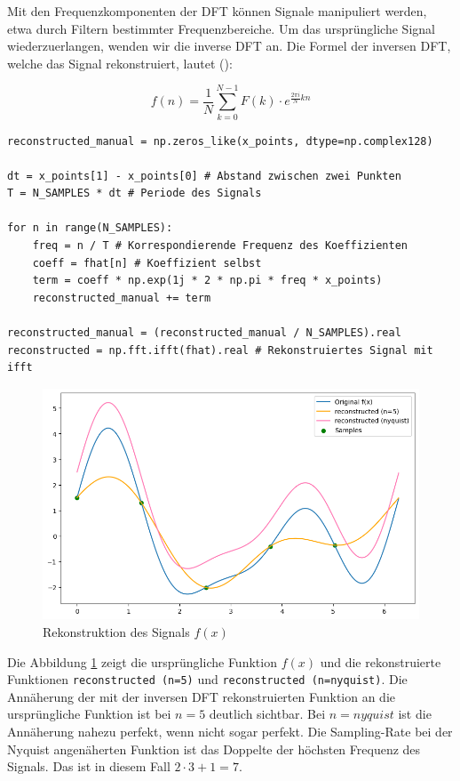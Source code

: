 \documentclass[11pt,a4paper]{article}
\begin{document}
\noindent
Mit den Frequenzkomponenten der DFT können Signale manipuliert werden, etwa durch Filtern 
bestimmter Frequenzbereiche. Um das ursprüngliche Signal wiederzuerlangen, wenden wir die inverse 
DFT an. Die Formel der inversen DFT, welche das Signal rekonstruiert, lautet 
(\cite[Chapter~3]{hansen2014fourier}):


\[
f(n) = \frac{1}{N} \sum_{k=0}^{N-1} F(k) \cdot e^{\frac{2\pi i}{N} kn}
\]

\begin{lstlisting}
reconstructed_manual = np.zeros_like(x_points, dtype=np.complex128)

dt = x_points[1] - x_points[0] # Abstand zwischen zwei Punkten
T = N_SAMPLES * dt # Periode des Signals

for n in range(N_SAMPLES):
    freq = n / T # Korrespondierende Frequenz des Koeffizienten
    coeff = fhat[n] # Koeffizient selbst
    term = coeff * np.exp(1j * 2 * np.pi * freq * x_points)
    reconstructed_manual += term

reconstructed_manual = (reconstructed_manual / N_SAMPLES).real
reconstructed = np.fft.ifft(fhat).real # Rekonstruiertes Signal mit ifft
\end{lstlisting}


\begin{figure}[h]
    \centering
    \includegraphics[width=0.60\linewidth]{img/dft_reconstructed.png}
    \caption{Rekonstruktion des Signals \(f(x)\)}
    \label{fig:dft_example_reconstructed}
\end{figure}


\noindent
\newline
Die Abbildung \ref{fig:dft_example_reconstructed} zeigt die ursprüngliche Funktion \(f(x)\) und die
rekonstruierte Funktionen \texttt{reconstructed (n=5)} und \texttt{reconstructed (n=nyquist)}.
Die Annäherung der mit der inversen DFT rekonstruierten Funktion an die ursprüngliche Funktion ist
bei \(n=5\) deutlich sichtbar. Bei \(n=nyquist\) ist die Annäherung nahezu perfekt, wenn nicht sogar
perfekt. Die Sampling-Rate bei der Nyquist angenäherten Funktion ist das Doppelte der höchsten
Frequenz des Signals. Das ist in diesem Fall \(2 \cdot 3 + 1 = 7\).
\end{document}
